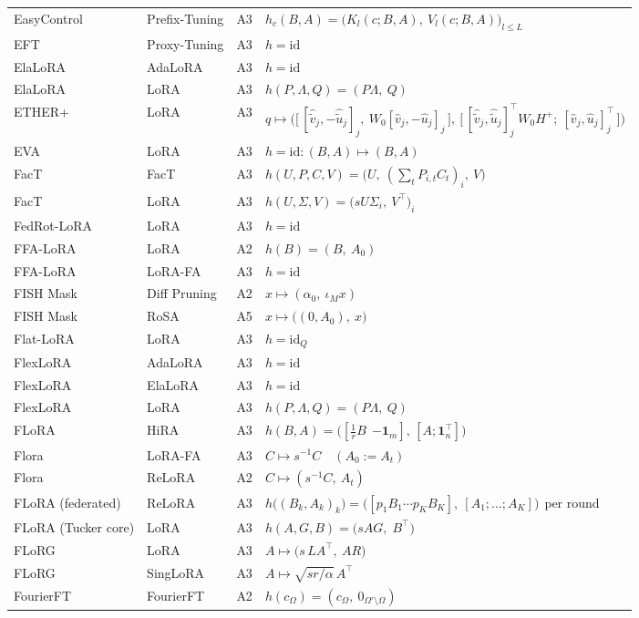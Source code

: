 \begin{longtable}{@{}>{\raggedright\arraybackslash}p{2.4cm}>{\raggedright\arraybackslash}p{2.4cm}c>{\raggedright\arraybackslash}p{8.6cm}@{}}
EasyControl & Prefix-Tuning & A3 & $h_c(B,A)=\big(K_l(c;B,A),\ V_l(c;B,A)\big)_{l\le L}$\\
EFT & Proxy-Tuning & A3 & $h=\mathrm{id}$\\
ElaLoRA & AdaLoRA & A3 & $h=\mathrm{id}$\\
ElaLoRA & LoRA & A3 & $h(P,\Lambda,Q)=(P\Lambda,\ Q)$\\
ETHER+ & LoRA & A3 & $q\mapsto\Big(\big[\,[\hat{\tilde v}_j,-\hat{\tilde u}_j]_j,\ W_0[\hat v_j,-\hat u_j]_j\,\big],\ \big[\,[\hat{\tilde v}_j,\hat{\tilde u}_j]_j^\top W_0H^+;\ [\hat v_j,\hat u_j]_j^\top\,\big]\Big)$\\
EVA & LoRA & A3 & $h=\mathrm{id}:(B,A)\mapsto(B,A)$\\
FacT & FacT & A3 & $h(U,P,C,V)=\big(U,\ (\textstyle\sum_tP_{i,t}C_t)_i,\ V\big)$\\
FacT & LoRA & A3 & $h(U,\Sigma,V)=\big(sU\Sigma_i,\ V^\top\big)_i$\\
FedRot-LoRA & LoRA & A3 & $h=\mathrm{id}$\\
FFA-LoRA & LoRA & A2 & $h(B)=(B,\ A_0)$\\
FFA-LoRA & LoRA-FA & A3 & $h=\mathrm{id}$\\
FISH Mask & Diff Pruning & A2 & $x\mapsto(\alpha_0,\ \iota_M x)$\\
FISH Mask & RoSA & A5 & $x\mapsto\big((0,A_0),\ x\big)$\\
Flat-LoRA & LoRA & A3 & $h=\mathrm{id}_Q$\\
FlexLoRA & AdaLoRA & A3 & $h=\mathrm{id}$\\
FlexLoRA & ElaLoRA & A3 & $h=\mathrm{id}$\\
FlexLoRA & LoRA & A3 & $h(P,\Lambda,Q)=(P\Lambda,\ Q)$\\
FLoRA & HiRA & A3 & $h(B,A)=\big([\tfrac1rB\;\,{-\mathbf 1_m}],\,[A;\mathbf 1_n^\top]\big)$\\
Flora & LoRA-FA & A3 & $C\mapsto s^{-1}C\quad(A_0:=A_t)$\\
Flora & ReLoRA & A2 & $C\mapsto(s^{-1}C,\ A_t)$\\
FLoRA (federated) & ReLoRA & A3 & $h\big((B_k,A_k)_k\big)=\big([p_1B_1\cdots p_KB_K],\ [A_1;\dots;A_K]\big)\ \ \text{per round}$\\
FLoRA (Tucker core) & LoRA & A3 & $h(A,G,B)=\big(sAG,\;B^\top\big)$\\
FLoRG & LoRA & A3 & $A\mapsto\big(s\,LA^\top,\ AR\big)$\\
FLoRG & SingLoRA & A3 & $A\mapsto\sqrt{sr/\alpha}\,A^\top$\\
FourierFT & FourierFT & A2 & $h(c_\Omega)=(c_\Omega,\ 0_{\Omega'\setminus\Omega})$\\

\end{longtable}
